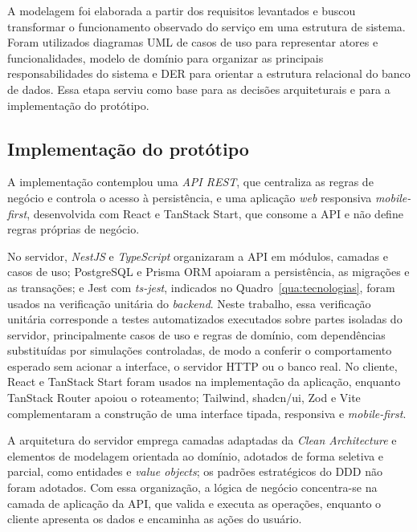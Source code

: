 \documentclass[a4paper,12pt]{article}
\begin{document}
A modelagem foi elaborada a partir dos requisitos levantados e buscou transformar o funcionamento observado do serviço em uma estrutura de sistema. Foram utilizados diagramas UML de casos de uso para representar atores e funcionalidades, modelo de domínio para organizar as principais responsabilidades do sistema e DER para orientar a estrutura relacional do banco de dados. Essa etapa serviu como base para as decisões arquiteturais e para a implementação do protótipo.

\subsection{Implementação do protótipo}
\label{sec:tecnologias}

A implementação contemplou uma \textit{API REST}, que centraliza as regras de negócio e controla o acesso à persistência, e uma aplicação \textit{web} responsiva \textit{mobile-first}, desenvolvida com React e TanStack Start, que consome a API e não define regras próprias de negócio.

No servidor, \textit{NestJS} \cite{nestjs} e \textit{TypeScript} organizaram a API em módulos, camadas e casos de uso; PostgreSQL e Prisma ORM \cite{prisma} apoiaram a persistência, as migrações e as transações; e Jest com \textit{ts-jest}, indicados no Quadro~\ref{qua:tecnologias}, foram usados na verificação unitária do \textit{backend}. Neste trabalho, essa verificação unitária corresponde a testes automatizados executados sobre partes isoladas do servidor, principalmente casos de uso e regras de domínio, com dependências substituídas por simulações controladas, de modo a conferir o comportamento esperado sem acionar a interface, o servidor HTTP ou o banco real. No cliente, React e TanStack Start foram usados na implementação da aplicação, enquanto TanStack Router \cite{tanstackrouter} apoiou o roteamento; Tailwind, shadcn/ui, Zod e Vite complementaram a construção de uma interface tipada, responsiva e \textit{mobile-first}.

A arquitetura do servidor emprega camadas adaptadas da \textit{Clean Architecture} e elementos de modelagem orientada ao domínio, adotados de forma seletiva e parcial, como entidades e \textit{value objects}; os padrões estratégicos do DDD não foram adotados. Com essa organização, a lógica de negócio concentra-se na camada de aplicação da API, que valida e executa as operações, enquanto o cliente apresenta os dados e encaminha as ações do usuário.
\end{document}
